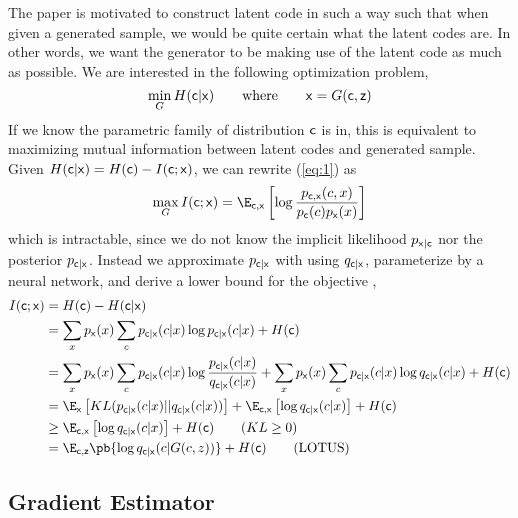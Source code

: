 \documentclass[11pt]{article}
\begin{document}
The paper is motivated to construct latent code in such a way such that when given a generated sample, we would be quite certain what the latent codes are. In other words, we want the generator to be making use of the latent code as much as possible. We are interested in the following optimization problem, 
\begin{equation}
    \label{eq:1}
    \min_{G} H(\mathsf{c}|\mathsf{x}) 
    \quad\quad \text{where}\quad\quad
    \mathsf{x} = G(\mathsf{c},\mathsf{z})
\end{equation}
If we know the parametric family of distribution $\mathsf{c}$ is in, this is equivalent to maximizing mutual information between latent codes and generated sample. Given $H(\mathsf{c}|\mathsf{x}) = H(\mathsf{c}) - I(\mathsf{c};\mathsf{x})$, we can rewrite (\ref{eq:1}) as
\[
    \max_G I(\rc; \rx) 
        = \E_{\rc,\rx}\left[ \log \frac{p_{\rc,\rx}(c,x) }{p_{\rc}(c) p_{\rx}(x)} \right]
\]
which is intractable, since we do not know the implicit likelihood $p_{\mathsf{x}|\mathsf{c}}$ nor the posterior $p_{\mathsf{c}|\mathsf{x}}$. Instead we approximate $p_{\mathsf{c}|\mathsf{x}}$ with using $q_{\mathsf{c}|\mathsf{x}}$, parameterize by a neural network, and derive a lower bound for the objective \cite{barberIMAlgorithmVariational2003,pooleVariationalBoundsMutual2019},
\begin{align*}
    I(\rc;\rx)
        &= H(\rc) - H(\rc|\rx) \\
        &= \sum_{x} p_{\rx}(x) \sum_{c} p_{\rc|\rx}(c|x) \log p_{\rc|\rx}(c|x) + H(\rc) \\
        &= \sum_{x} p_{\rx}(x) \sum_{c} p_{\rc|\rx}(c|x) \log \frac{p_{\rc|\rx}(c|x)}{q_{\rc|\rx}(c|x)} + \sum_{x} p_{\rx}(x) \sum_{c} p_{\rc|\rx}(c|x) \log q_{\rc|\rx}(c|x) + H(\rc) \\
        &= \E_{\rx} \left[ KL(p_{\rc|\rx}(c|x) || q_{\rc|\rx}(c|x)) \right] + \E_{\rc,\rx} \left[ \log q_{\rc|\rx}(c|x) \right] + H(\rc) \\
        &\geq  \E_{\rc,\rx} \left[ \log q_{\rc|\rx}(c|x) \right] + H(\rc)  \tag{$KL \geq 0$} \\
        &= \E_{\rc,\rz} \pb{ \log q_{\rc|\rx}(c|G(c,z)) } + H(\rc) \tag{LOTUS}
\end{align*}

\subsection{Gradient Estimator}
\end{document}
